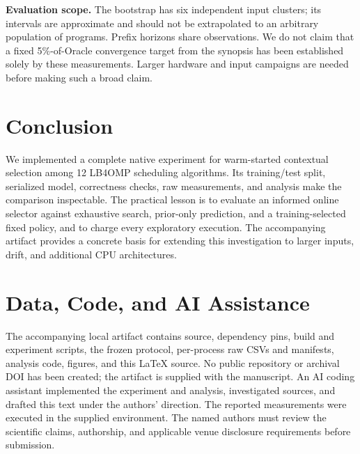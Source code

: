 \documentclass[10pt,letterpaper]{article}
\begin{document}
\textbf{Evaluation scope.} The bootstrap has six independent input clusters;
its intervals are approximate and should not be extrapolated to an arbitrary
population of programs. Prefix horizons share observations. We do not claim
that a fixed 5\%-of-Oracle convergence target from the synopsis has been
established solely by these measurements. Larger hardware and input campaigns
are needed before making such a broad claim.

\section{Conclusion}

We implemented a complete native experiment for warm-started contextual
selection among 12 LB4OMP scheduling algorithms. Its training/test split,
serialized model, correctness checks, raw measurements, and analysis make the
comparison inspectable. \ConclusionFinding{}
The practical lesson is to evaluate an informed online selector against
exhaustive search, prior-only prediction, and a training-selected fixed policy,
and to charge every exploratory execution. The accompanying artifact provides
a concrete basis for extending this investigation to larger inputs, drift,
and additional CPU architectures.

\section*{Data, Code, and AI Assistance}

The accompanying local artifact contains source, dependency pins, build and
experiment scripts, the frozen protocol, per-process raw CSVs and manifests,
analysis code, figures, and this LaTeX source. No public repository or archival
DOI has been created; the artifact is supplied with the manuscript. An AI
coding assistant implemented the experiment and analysis, investigated
sources, and drafted this text under the authors' direction. The reported
measurements were executed in the supplied environment. The named authors
must review the scientific claims, authorship, and applicable venue disclosure
requirements before submission.
\end{document}
